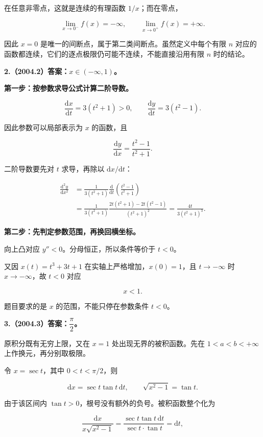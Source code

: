 \documentclass[UTF8,11pt,fontset=windows]{ctexart}
\begin{document}
在任意非零点，这就是连续的有理函数 $1/x$；而在零点，

$$
\lim_{x\to0^-}f(x)=-\infty,\qquad
\lim_{x\to0^+}f(x)=+\infty.
$$

因此 $x=0$ 是唯一的间断点，属于第二类间断点。虽然定义中每个有限 $n$ 对应的函数都连续，它们的逐点极限仍可能不连续，不能直接沿用有限 $n$ 时的结论。

\clearpage

\textbf{2.（2004.2）答案：$x\in(-\infty,1)$。}

\textbf{第一步：按参数求导公式计算二阶导数。}

$$
\frac{\mathrm dx}{\mathrm dt}=3(t^2+1)>0,
\qquad \frac{\mathrm dy}{\mathrm dt}=3(t^2-1).
$$

因此参数可以局部表示为 $x$ 的函数，且

$$
\frac{\mathrm dy}{\mathrm dx}=\frac{t^2-1}{t^2+1}.
$$

二阶导数要先对 $t$ 求导，再除以 $\mathrm dx/\mathrm dt$：

$$
\begin{aligned}
\frac{\mathrm d^2y}{\mathrm dx^2}
 &=\frac{1}{3(t^2+1)}\frac{\mathrm d}{\mathrm dt}
   \left(\frac{t^2-1}{t^2+1}\right)\\
 &=\frac{1}{3(t^2+1)}
   \frac{2t(t^2+1)-2t(t^2-1)}{(t^2+1)^2}
 =\frac{4t}{3(t^2+1)^3}.
\end{aligned}
$$

\textbf{第二步：先判定参数范围，再换回横坐标。}

向上凸对应 $y''<0$。分母恒正，所以条件等价于 $t<0$。

又因 $x(t)=t^3+3t+1$ 在实轴上严格增加，$x(0)=1$，且 $t\to-\infty$ 时 $x\to-\infty$，故 $t<0$ 对应

$$
\boxed{x<1.}
$$

题目要求的是 $x$ 的范围，不能只停在参数条件 $t<0$。

\clearpage

\textbf{3.（2004.3）答案：$\dfrac\pi2$。}

原积分既有无穷上限，又在 $x=1$ 处出现无界的被积函数。先在 $1<a<b<+\infty$ 上作换元，再分别取极限。

令 $x=\sec t$，其中 $0<t<\pi/2$，则

$$
\mathrm dx=\sec t\tan t\,\mathrm dt,
\qquad \sqrt{x^2-1}=\tan t.
$$

由于该区间内 $\tan t>0$，根号没有额外的负号。被积函数整个化为

$$
\frac{\mathrm dx}{x\sqrt{x^2-1}}
=\frac{\sec t\tan t\,\mathrm dt}{\sec t\cdot\tan t}=\mathrm dt,
$$
\end{document}
